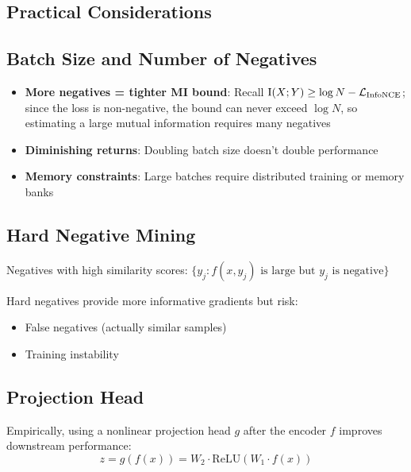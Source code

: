 \begin{notechapter}
\section{Practical Considerations}

\subsection{Batch Size and Number of Negatives}

\begin{itemize}
    \item \textbf{More negatives = tighter MI bound}: Recall $\mathrm{I}(X;Y) \geq \log N - \mathcal{L}_{\text{InfoNCE}}$; since the loss is non-negative, the bound can never exceed $\log N$, so estimating a large mutual information requires many negatives
    \item \textbf{Diminishing returns}: Doubling batch size doesn't double performance
    \item \textbf{Memory constraints}: Large batches require distributed training or memory banks
\end{itemize}

\subsection{Hard Negative Mining}

\begin{definition}
Negatives with high similarity scores: $\{y_j : f(x, y_j) \text{ is large but } y_j \text{ is negative}\}$
\end{definition}

Hard negatives provide more informative gradients but risk:
\begin{itemize}
    \item False negatives (actually similar samples)
    \item Training instability
\end{itemize}

\subsection{Projection Head}

Empirically, using a nonlinear projection head $g$ after the encoder $f$ improves downstream performance:
\begin{equation}
z = g(f(x)) = W_2 \cdot \text{ReLU}(W_1 \cdot f(x))
\end{equation}


\end{notechapter}

